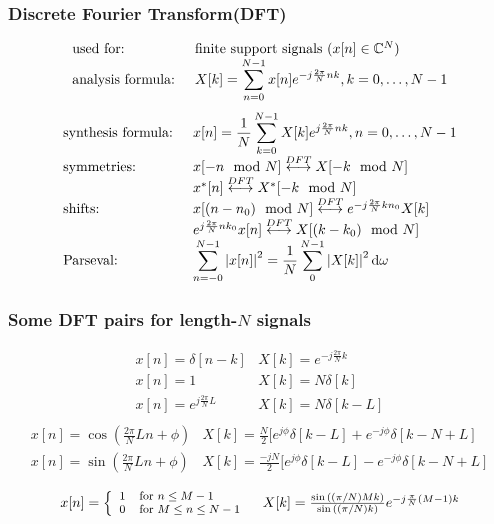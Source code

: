 \documentclass{article}
\begin{document}
\begin{multicols}{2}
\subsubsection{Discrete Fourier Transform(DFT)}
$$
\begin{array}{ll}
\text{used for:}  & \text{finite support signals (} x [n] \in \mathbb{C} ^N \text ) \\
\text{analysis formula: }&  X[k] = \displaystyle \sum_{n=0}^{N-1}  x[n]e^{-j\frac{2\pi}N nk}, k = 0,\ldots, N-1\\
\end{array}
$$ $$
\begin{array}{ll}
\text{synthesis formula: }&  x[n]= \displaystyle \frac1N  \sum_{k=0}^{N-1}  X[k] e^{j\frac{2\pi}N nk}, n = 0,\ldots, N-1 \\
\text{symmetries:} &  x[-n \mod N]   \overset{DFT}{\longleftrightarrow}   X[-k\mod N] \\
& x^*[n]   \overset{DFT}{\longleftrightarrow}  X^*[-k \mod N] \\
\text{shifts:} &  x[(n-n_0) \mod N]  \overset{DFT}{\longleftrightarrow} e^{-j\frac{2\pi}N kn_0}  X[k]\\
& e^{j\frac{2\pi}N nk_0} x[n] \overset{DFT}{\longleftrightarrow}  X[(k - k_0) \mod N]\\
\text{Parseval:} & \displaystyle \sum_{n=-0}^{N-1} \left |  x[n] \right | ^2 = \frac1N \displaystyle \sum_0^{N-1} \left |  X[k] \right | ^2 \mathrm{d} \omega
\end{array}
$$
\subsubsection{Some DFT pairs for length-$N$ signals}
$$
\begin{array}{ll}
x[n] = \delta[n-k] & X[k] =  e^{-j\frac{2\pi}N k} \\
x[n] = 1 & X[k]  = N\delta[k]\\
x[n] = e^{j\frac{2\pi}N L} & X[k] =N\delta[k-L] \\
\end{array}
$$ $$
\begin{array}{ll}
x[n] = \cos (\frac{2\pi}N Ln + \phi) & X[k] = \frac N2 [ e^{j\phi} \delta[k-L] + e^{-j\phi} \delta[k-N+L ]\\
x[n] = \sin (\frac{2\pi}N Ln + \phi) & X[k] = \frac{-jN}2 [ e^{j\phi} \delta[k-L] - e^{-j\phi} \delta[k-N+L ]\\
\end{array}
$$ $$
\begin{array}{ll}
x[n] = \left\{\footnotesize{\begin{array}{ll} 1 & \text{for } n\leq M-1 \\ 0 & \text{for } M\leq n\leq N-1 \end{array}}\right.
& X[k] = \frac{\sin{((\pi/N)Mk)}}{\sin{((\pi/N)k)}}e^{-j\frac{\pi}N (M-1)k} \\
\end{array}
$$
\end{multicols}
\end{document}
